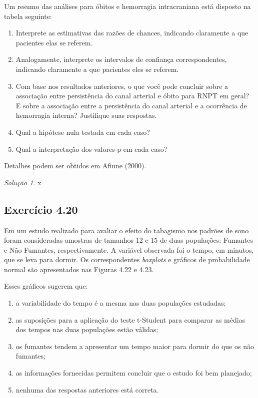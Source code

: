 \documentclass[
]{latex/krantz}
\providecommand{\tightlist}{%
  \setlength{\itemsep}{0pt}\setlength{\parskip}{0pt}}
\theoremstyle{definition}
\theoremstyle{definition}
\theoremstyle{definition}
\theoremstyle{definition}
\theoremstyle{remark}
\newtheorem*{solution}{Solução}
\begin{document}
Um resumo das análises para óbitos e hemorragia intracraniana está disposto na tabela seguinte:

\begin{enumerate}
\def\labelenumi{\alph{enumi}.}
\tightlist
\item
  Interprete as estimativas das razões de chances, indicando claramente a que pacientes elas se referem.
\item
  Analogamente, interprete os intervalos de confiança correspondentes, indicando claramente a que pacientes eles se referem.
\item
  Com base nos resultados anteriores, o que você pode concluir sobre a associação entre persistência do canal arterial e óbito para RNPT em geral? E sobre a associação entre a persistência do canal arterial e a ocorrência de hemorragia interna? Justifique suas respostas.
\item
  Qual a hipótese nula testada em cada caso?
\item
  Qual a interpretação dos valores-p em cada caso?
\end{enumerate}

Detalhes podem ser obtidos em Afiune (2000).

\begin{solution}
x
\end{solution}

\hypertarget{exr4-20}{%
\subsection*{Exercício 4.20}\label{exr4-20}}

Em um estudo realizado para avaliar o efeito do tabagismo nos padrões de sono foram consideradas amostras de tamanhos 12 e 15 de duas populações: Fumantes e Não Fumantes, respectivamente. A variável observada foi o tempo, em minutos, que se leva para dormir. Os correspondentes \emph{boxplots} e gráficos de probabilidade normal são apresentados nas Figuras 4.22 e 4.23.

Esses gráficos sugerem que:

\begin{enumerate}
\def\labelenumi{\alph{enumi}.}
\tightlist
\item
  a variabilidade do tempo é a mesma nas duas populações estudadas;
\item
  as suposições para a aplicação do teste t-Student para comparar as médias dos tempos nas duas populações estão válidas;
\item
  os fumantes tendem a apresentar um tempo maior para dormir do que os não fumantes;
\item
  as informações fornecidas permitem concluir que o estudo foi bem planejado;
\item
  nenhuma das respostas anteriores está correta.
\end{enumerate}
\end{document}
